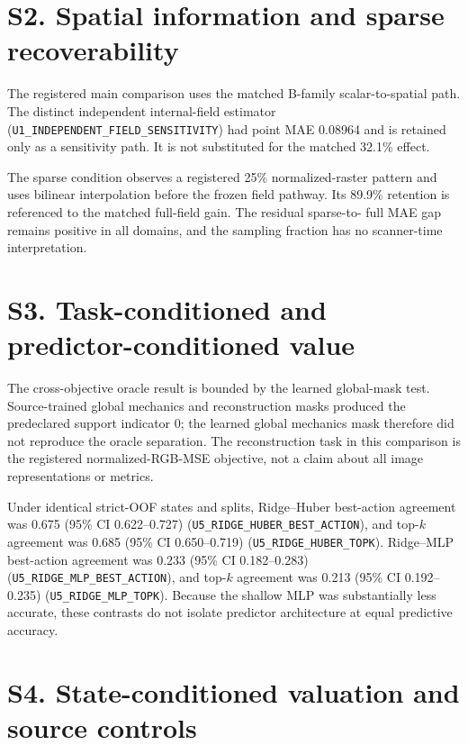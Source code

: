 \documentclass[11pt]{article}
\begin{document}
\section{S2. Spatial information and sparse recoverability}

The registered main comparison uses the matched B-family scalar-to-spatial
path. The distinct independent internal-field estimator
(\texttt{U1\_INDEPENDENT\_FIELD\_SENSITIVITY}) had point MAE 0.08964 and is
retained only as a sensitivity path. It is not substituted for the matched
32.1\% effect.

The sparse condition observes a registered 25\% normalized-raster pattern and
uses bilinear interpolation before the frozen field pathway. Its 89.9\%
retention is referenced to the matched full-field gain. The residual sparse-to-
full MAE gap remains positive in all domains, and the sampling fraction has no
scanner-time interpretation.

\section{S3. Task-conditioned and predictor-conditioned value}

The cross-objective oracle result is bounded by the learned global-mask test.
Source-trained global mechanics and reconstruction masks produced the
predeclared support indicator 0; the learned global mechanics mask therefore
did not reproduce the oracle separation. The reconstruction task in this
comparison is the registered normalized-RGB-MSE objective, not a claim about
all image representations or metrics.

Under identical strict-OOF states and splits, Ridge--Huber best-action agreement
was 0.675 (95\% CI 0.622--0.727)
(\texttt{U5\_RIDGE\_HUBER\_BEST\_ACTION}), and top-$k$ agreement was 0.685
(95\% CI 0.650--0.719) (\texttt{U5\_RIDGE\_HUBER\_TOPK}). Ridge--MLP
best-action agreement was 0.233 (95\% CI 0.182--0.283)
(\texttt{U5\_RIDGE\_MLP\_BEST\_ACTION}), and top-$k$ agreement was 0.213
(95\% CI 0.192--0.235) (\texttt{U5\_RIDGE\_MLP\_TOPK}). Because the shallow
MLP was substantially less accurate, these contrasts do not isolate predictor
architecture at equal predictive accuracy.

\section{S4. State-conditioned valuation and source controls}
\end{document}
